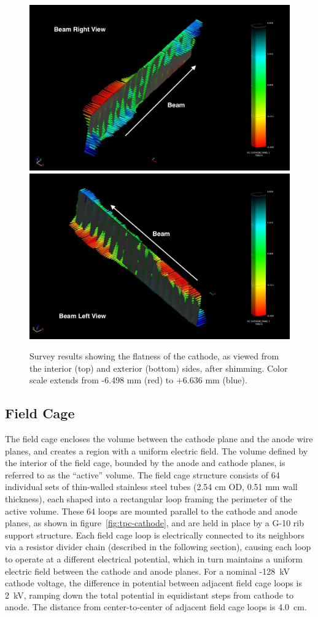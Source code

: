 \begin{figure}
\centering
\includegraphics[width=0.75\linewidth]{figures/Cathode_BeamRight.jpg}
\includegraphics[width=0.75\linewidth]{figures/Cathode_BeamLeft.jpg}
\caption{Survey results showing the flatness of the cathode, as viewed from the interior (top) and exterior (bottom) sides, after shimming.  Color scale extends from -6.498 mm (red) to +6.636 mm (blue).}
\label{fig:tpc-cathode-survey}
\end{figure}

\subsection{Field Cage}
The field cage encloses the volume between the cathode plane and the anode wire planes, and creates a region with a uniform electric field.  The volume defined by the interior of the field cage, bounded by the anode and cathode planes, is referred to as the ``active'' volume.   The field cage structure consists of 64 individual sets of thin-walled stainless steel tubes (2.54 cm OD, 0.51 mm wall thickness), each shaped into a rectangular loop framing the perimeter of the active volume. These 64 loops are mounted parallel to the cathode and anode planes, as shown in figure~\ref{fig:tpc-cathode}, and are held in place by a G-10 rib support structure. Each field cage loop is electrically connected to its neighbors via a resistor divider chain (described in the following section), causing each loop to operate at a different electrical potential, which in turn maintains a uniform electric field between the cathode and anode planes. For a nominal -128~kV cathode voltage, the difference in potential between adjacent field cage loops is 2~kV, ramping down the total potential in equidistant steps from cathode to anode. The distance from center-to-center of adjacent field cage loops is 4.0~cm.

